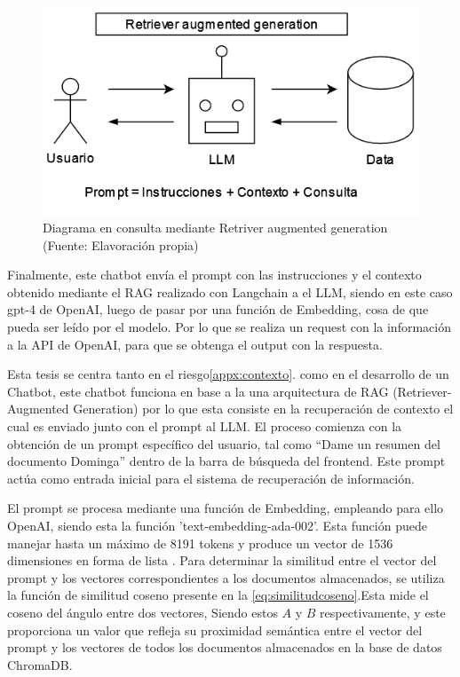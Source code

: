 \begin{figure}[ht!]
    \centering
    \includegraphics[width=.4\textwidth]{figures/huemul5.png}
    \caption[Diagrama en consulta mediante Retriver augmented generation]{Diagrama en consulta mediante Retriver augmented generation\\
    {\scriptsize (Fuente: Elavoración propia)}}
    \label{fig:chatbot1}
\end{figure}

Finalmente, este chatbot envía el prompt con las instrucciones y el contexto obtenido mediante el RAG realizado con 
Langchain a el LLM, siendo en este caso gpt-4 de OpenAI, luego de pasar por una función de Embedding, cosa de que 
pueda ser leído por el modelo. Por lo que se realiza un request con la información a la API de OpenAI, para que se 
obtenga el output con la respuesta.


Esta tesis se centra tanto en el riesgo\autoref{appx:contexto}. como en el desarrollo de un Chatbot, este chatbot funciona 
en base a la una arquitectura de RAG (Retriever-Augmented Generation) por lo que esta consiste en 
la recuperación de contexto el cual es enviado junto con el prompt al LLM. El proceso comienza con 
la obtención de un prompt específico del usuario, tal como ``Dame un resumen del documento Dominga'' 
dentro de la barra de búsqueda del frontend. Este prompt actúa como entrada inicial para el sistema 
de recuperación de información.


El prompt se procesa mediante una función de Embedding, empleando para ello OpenAI, siendo esta  
la función 'text-embedding-ada-002'. Esta función puede manejar hasta un máximo de 8191 tokens y 
produce un vector de 1536 dimensiones en forma de lista \cite{openai1}. Para determinar la similitud entre el 
vector del prompt y los vectores correspondientes a los documentos almacenados, se utiliza la función 
de similitud coseno presente en la \autoref{eq:similitudcoseno}.Esta mide el coseno del ángulo entre dos vectores,
Siendo estos $A$ y $B$ respectivamente, y este proporciona un valor que refleja su proximidad semántica entre el vector
del prompt y los vectores de todos los documentos almacenados en la base de datos ChromaDB.

